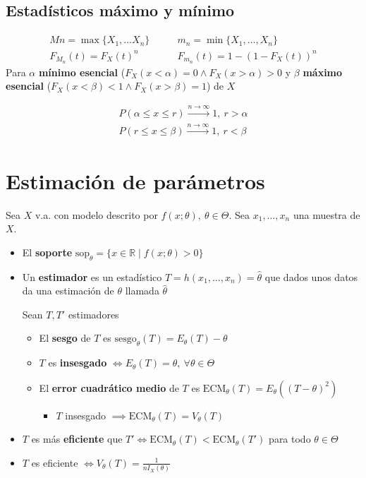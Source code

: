\documentclass[a4paper,twocolumn]{extarticle}
\theoremstyle{remark}
\newcommand{\R}{\mathbb{R}}
\begin{document}
\subsection{Estadísticos máximo y mínimo}

\begin{align*}
	Mn = \max\{X_1, \dots X_n\} &\qquad m_n = \min \{X_1, \dots, X_n\} \\
	F_{M_n}(t) = F_X(t)^n &\qquad F_{m_n}(t) = 1 - (1 - F_X(t))^n
\end{align*}
Para $\alpha$ \textbf{mínimo esencial} ($F_X(x < \alpha) = 0 \land F_X(x > \alpha) > 0$ y $\beta$ \textbf{máximo esencial} ($F_X(x < \beta) < 1 \land F_X(x > \beta) = 1$)  de $X$

\begin{align*}
P(\alpha \leq x \leq r) \xrightarrow{n \to \infty} 1,\ r > \alpha \\
P(r \leq x \leq \beta) \xrightarrow{n \to \infty} 1,\ r < \beta
\end{align*}


\section{Estimación de parámetros}

Sea $X$ v.a. con modelo descrito por $f(x; \theta),\ \theta \in \Theta$. Sea $x_1, \dots, x_n$ una muestra de $X$.

\begin{itemize}
	\item El \textbf{soporte} $\text{sop}_\theta = \{x \in \R \mid f(x; \theta) > 0\}$
	\item Un \textbf{estimador} es un estadístico $T = h(x_1, \dots, x_n) = \widehat{\theta}$ que dados unos datos da una estimación de $\theta$ llamada $\widehat{\theta}$
	
	Sean $T, T'$ estimadores
	\begin{itemize}
		\item El \textbf{sesgo} de $T$ es $\text{sesgo}_\theta (T) = E_\theta(T) - \theta$
		\item $T$ es \textbf{insesgado} $\iff E_\theta(T) = \theta,\ \forall \theta \in \Theta$
		\item El \textbf{error cuadrático medio} de $T$ es $\text{ECM}_\theta(T) = E_\theta((T - \theta)^2)$
		\begin{itemize}
			\item $T$ insesgado $\implies \text{ECM}_\theta(T) = V_\theta(T)$
		\end{itemize}
	\end{itemize}
	\item $T$ es más \textbf{eficiente} que $T' \iff \text{ECM}_\theta(T) < \text{ECM}_\theta(T')$ para todo $\theta \in \Theta$
	\item $T$ es eficiente $\iff V_\theta(T) = \frac{1}{nI_X(\theta)}$
\end{itemize}
\end{document}
